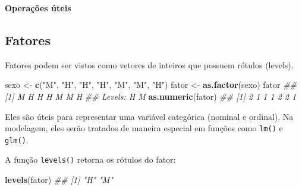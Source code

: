 \documentclass[]{book}
\newenvironment{Shaded}{\begin{snugshade}}{\end{snugshade}}
\newcommand{\CommentTok}[1]{\textcolor[rgb]{0.56,0.35,0.01}{\textit{#1}}}
\newcommand{\DecValTok}[1]{\textcolor[rgb]{0.00,0.00,0.81}{#1}}
\newcommand{\KeywordTok}[1]{\textcolor[rgb]{0.13,0.29,0.53}{\textbf{#1}}}
\newcommand{\NormalTok}[1]{#1}
\newcommand{\OperatorTok}[1]{\textcolor[rgb]{0.81,0.36,0.00}{\textbf{#1}}}
\newcommand{\StringTok}[1]{\textcolor[rgb]{0.31,0.60,0.02}{#1}}
\begin{document}
\textbf{Operações úteis}

\begin{Shaded}
\end{Shaded}

\hypertarget{fatores}{%
\subsection{Fatores}\label{fatores}}

Fatores podem ser vistos como vetores de inteiros que possuem rótulos (levels).

\begin{Shaded}
\begin{Highlighting}[]
\NormalTok{sexo <-}\StringTok{ }\KeywordTok{c}\NormalTok{(}\StringTok{"M"}\NormalTok{, }\StringTok{"H"}\NormalTok{, }\StringTok{"H"}\NormalTok{, }\StringTok{"H"}\NormalTok{, }\StringTok{"M"}\NormalTok{, }\StringTok{"M"}\NormalTok{, }\StringTok{"H"}\NormalTok{)}
\NormalTok{fator <-}\StringTok{ }\KeywordTok{as.factor}\NormalTok{(sexo)}
\NormalTok{fator}
\CommentTok{## [1] M H H H M M H}
\CommentTok{## Levels: H M}
\KeywordTok{as.numeric}\NormalTok{(fator)}
\CommentTok{## [1] 2 1 1 1 2 2 1}
\end{Highlighting}
\end{Shaded}

Eles são úteis para representar uma variável categórica (nominal e ordinal). Na modelagem, eles serão tratados de maneira especial em funções como \texttt{lm()} e \texttt{glm()}.

A função \texttt{levels()} retorna os rótulos do fator:

\begin{Shaded}
\begin{Highlighting}[]
\KeywordTok{levels}\NormalTok{(fator)}
\CommentTok{## [1] "H" "M"}
\end{Highlighting}
\end{Shaded}
\end{document}
